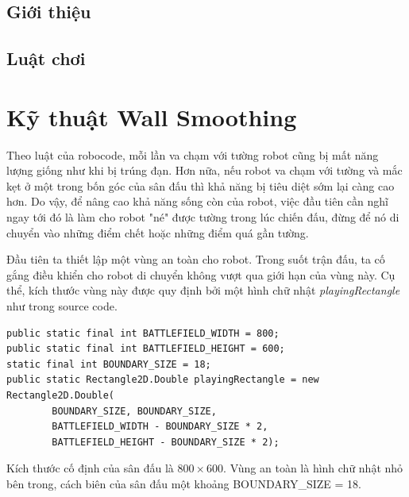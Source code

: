 \documentclass[14pt]{article}
\begin{document}
\subsection{Giới thiệu}
\subsection{Luật chơi}
\section{Kỹ thuật Wall Smoothing}
Theo luật của robocode, mỗi lần va chạm với tường robot cũng bị mất năng lượng giống như khi bị trúng đạn. Hơn nữa, nếu robot va chạm với tường và mắc kẹt ở một trong bốn góc của sân đấu thì khả năng bị tiêu diệt sớm lại càng cao hơn. Do vậy, để nâng cao khả năng sống còn của robot, việc đầu tiên cần nghĩ ngay tới đó là làm cho robot "né" được tường trong lúc chiến đấu, đừng để nó di chuyển vào những điểm chết hoặc những điểm quá gần tường.

Đầu tiên ta thiết lập một vùng an toàn cho robot. Trong suốt trận đấu, ta cố gắng điều khiển cho robot di chuyển không vượt qua giới hạn của vùng này. Cụ thể, kích thước vùng này được quy định bởi một hình chữ nhật \textit{playingRectangle} như trong source code.
\begin{lstlisting}[caption = Thiết lập vùng an toàn, frame = single]
public static final int BATTLEFIELD_WIDTH = 800;
public static final int BATTLEFIELD_HEIGHT = 600;
static final int BOUNDARY_SIZE = 18;
public static Rectangle2D.Double playingRectangle = new Rectangle2D.Double(
		BOUNDARY_SIZE, BOUNDARY_SIZE,
		BATTLEFIELD_WIDTH - BOUNDARY_SIZE * 2, 
		BATTLEFIELD_HEIGHT - BOUNDARY_SIZE * 2);
\end{lstlisting}
Kích thước cố định của sân đấu là $800 \times 600$. Vùng an toàn là hình chữ nhật nhỏ bên trong, cách biên của sân đấu một khoảng BOUNDARY\_SIZE = 18.
\end{document}

